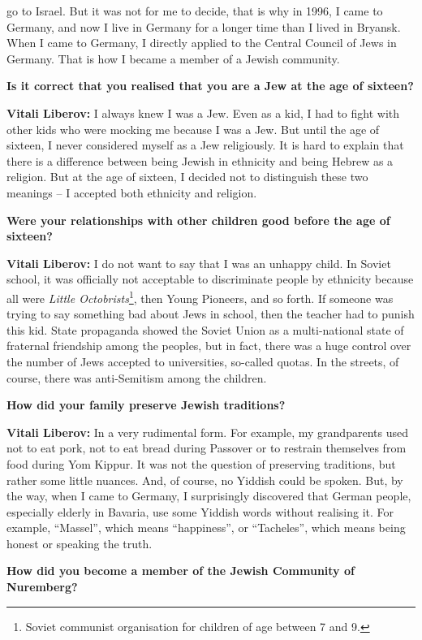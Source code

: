 go to Israel. But it was not for me to decide, that is why in 1996, I came to Germany, and now I live in Germany for a longer time than I lived in Bryansk. When I came to Germany, I directly applied to the Central Council of Jews in Germany. That is how I became a member of a Jewish community.  

\textbf{Is it correct that you realised that you are a Jew at the age of sixteen?} 

\textbf{Vitali Liberov:} I always knew I was a Jew. Even as a kid, I had to fight with other kids who were mocking me because I was a Jew. But until the age of sixteen, I never considered myself as a Jew religiously. It is hard to explain that there is a difference between being Jewish in ethnicity and being Hebrew as a religion. But at the age of sixteen, I decided not to distinguish these two meanings – I accepted both ethnicity and religion.  

\textbf{Were your relationships with other children good before the age of sixteen?} 

\textbf{Vitali Liberov:} I do not want to say that I was an unhappy child. In Soviet school, it was officially not acceptable to discriminate people by ethnicity because all were \textit{Little Octobrists}\footnote{Soviet communist organisation for children of age between 7 and 9.}, then Young Pioneers, and so forth. If someone was trying to say something bad about Jews in school, then the teacher had to punish this kid. State propaganda showed the Soviet Union as a multi-national state of fraternal friendship among the peoples, but in fact, there was a huge control over the number of Jews accepted to universities, so-called quotas. In the streets, of course, there was anti-Semitism among the children.  

\textbf{How did your family preserve Jewish traditions?} 

\textbf{Vitali Liberov:} In a very rudimental form. For example, my grandparents used not to eat pork, not to eat bread during Passover or to restrain themselves from food during Yom Kippur. It was not the question of preserving traditions, but rather some little nuances. And, of course, no Yiddish could be spoken. But, by the way, when I came to Germany, I surprisingly discovered that German people, especially elderly in Bavaria, use some Yiddish words without realising it. For example, ``Massel'', which means ``happiness'', or ``Tacheles'', which means being honest or speaking the truth.  

\textbf{How did you become a member of the Jewish Community of Nuremberg?} 

